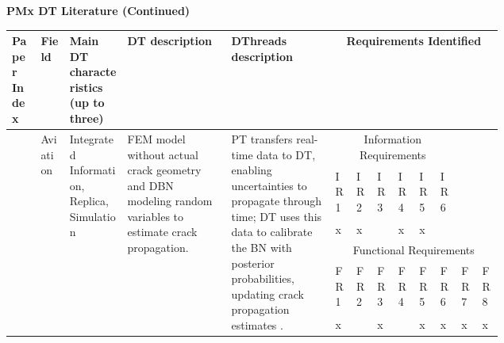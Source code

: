 \documentclass[runningheads]{llncs}
\begin{document}
\begin{landscape}
\begin{small}
\begin{longtable}
\end{longtable}
\end{small}

\newpage
        \textbf{PMx DT Literature (Continued)}
        \vspace{2mm}
        
        \begin{small}
    \begin{longtable}{p{0.05\linewidth}p{0.05\linewidth}p{0.1\linewidth}p{0.18\linewidth}p{0.18\linewidth}p{0.02\linewidth}p{0.02\linewidth}p{0.02\linewidth}p{0.02\linewidth}p{0.02\linewidth}p{0.02\linewidth}p{0.02\linewidth}p{0.02\linewidth}}
    \bottomrule

    
        Paper Index & Field & Main DT characteristics (up to three) & DT description & DThreads description & \multicolumn{8}{c}{Requirements Identified} \\\bottomrule
        
        \vspace{3mm}
        \multirow{6}{=}{\cite{li2017dynamic}} & \multirow{6}{=}{Aviation} &  \multirow{6}{=}{Integrated Information, Replica, Simulation} & \multirow{6}{=}{FEM model without actual crack geometry and DBN modeling random variables to estimate crack propagation.} & \multirow{6}{=}{PT transfers real-time data to DT, enabling uncertainties to propagate through time; DT uses this data to calibrate the BN with posterior probabilities, updating crack propagation estimates .} & \multicolumn{6}{c}{Information Requirements} &  \\\cmidrule{6-11}
        & & & & & IR1 & IR2 & IR3 & IR4 & IR5 & IR6 & & \\\cmidrule{6-11}
        & & & & & x & x &  & x & x &  & & \\\cmidrule{6-13}
        \vspace{3mm}
        & & & & & \multicolumn{8}{c}{Functional Requirements} \\\cmidrule{6-13}
        & & & & & FR1 & FR2 & FR3 & FR4 & FR5 & FR6 & FR7 & FR8 \\\cmidrule{6-13}
        & & & & & x &  & x &  & x & x & x & x \\\bottomrule




\end{longtable}
\end{small}



\end{landscape}
\end{document}
